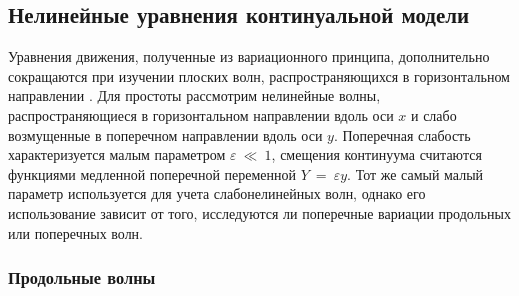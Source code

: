 \subsection{Нелинейные уравнения континуальной модели}
Уравнения движения, полученные из вариационного принципа, дополнительно сокращаются при изучении плоских волн, распространяющихся в горизонтальном направлении \cite {porkros}. Для простоты рассмотрим нелинейные волны, распространяющиеся в горизонтальном направлении вдоль оси $ x $ и слабо возмущенные в поперечном направлении вдоль оси $y$. Поперечная слабость характеризуется малым параметром $\varepsilon ~ \ll ~ 1$, смещения континуума считаются функциями медленной поперечной переменной $Y ~=~ \varepsilon y$. Тот же самый малый параметр используется для учета слабонелинейных волн, однако его использование зависит от того, исследуются ли поперечные вариации продольных или поперечных волн. 

\subsubsection{Продольные волны}

